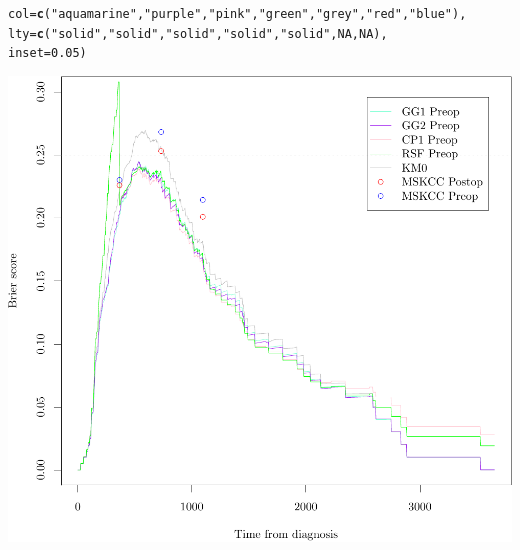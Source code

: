 \documentclass{article}\usepackage[]{graphicx}\usepackage[]{color}
\makeatletter
\def\maxwidth{ %
  \ifdim\Gin@nat@width>\linewidth
    \linewidth
  \else
    \Gin@nat@width
  \fi
}
\newcommand{\hlnum}[1]{\textcolor[rgb]{0.686,0.059,0.569}{#1}}%
\newcommand{\hlstr}[1]{\textcolor[rgb]{0.192,0.494,0.8}{#1}}%
\newcommand{\hlstd}[1]{\textcolor[rgb]{0.345,0.345,0.345}{#1}}%
\newcommand{\hlkwc}[1]{\textcolor[rgb]{0.333,0.667,0.333}{#1}}%
\newcommand{\hlkwd}[1]{\textcolor[rgb]{0.737,0.353,0.396}{\textbf{#1}}}%
\newenvironment{kframe}{%
 \def\at@end@of@kframe{}%
 \ifinner\ifhmode%
  \def\at@end@of@kframe{\end{minipage}}%
  \begin{minipage}{\columnwidth}%
 \fi\fi%
 \def\FrameCommand##1{\hskip\@totalleftmargin \hskip-\fboxsep
 \colorbox{shadecolor}{##1}\hskip-\fboxsep
     \hskip-\linewidth \hskip-\@totalleftmargin \hskip\columnwidth}%
 \MakeFramed {\advance\hsize-\width
   \@totalleftmargin\z@ \linewidth\hsize
   \@setminipage}}%
 {\par\unskip\endMakeFramed%
 \at@end@of@kframe}
\newenvironment{knitrout}{}{} %
\makeatother
\begin{document}
\begin{knitrout}
\begin{kframe}
\begin{alltt}
        \hlkwc{col} \hlstd{=} \hlkwd{c}\hlstd{(}        \hlstr{"aquamarine"}\hlstd{,}   \hlstr{"purple"}\hlstd{,}               \hlstr{"pink"}\hlstd{,}                 \hlstr{"green"}\hlstd{,}                \hlstr{"grey"}\hlstd{,}         \hlstr{"red"}\hlstd{,}                          \hlstr{"blue"}\hlstd{),}
        \hlkwc{lty} \hlstd{=} \hlkwd{c}\hlstd{(}        \hlstr{"solid"}\hlstd{,}                \hlstr{"solid"}\hlstd{,}                \hlstr{"solid"}\hlstd{,}                \hlstr{"solid"}\hlstd{,}                \hlstr{"solid"}\hlstd{,}        \hlnum{NA}\hlstd{,}                             \hlnum{NA}\hlstd{),}
        \hlkwc{inset} \hlstd{=} \hlnum{0.05}\hlstd{)}
\end{alltt}
\end{kframe}

{\centering \includegraphics[width=\maxwidth]{figure/05-prob-bs-paths-1} 

}



\end{knitrout}
\end{document}

